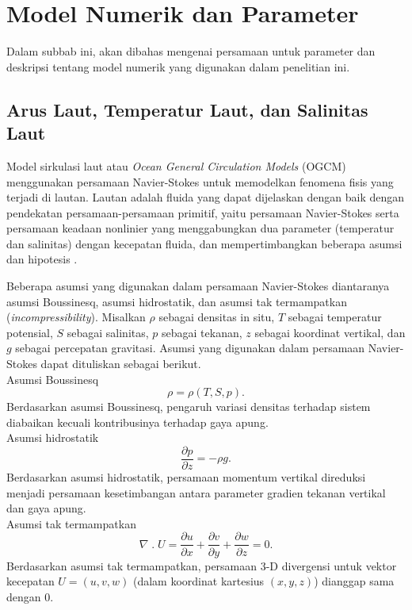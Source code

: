 \section[Model Numerik dan Parameter]{Model Numerik dan Parameter}
\begin{spacing}{1.5}
	\par Dalam subbab ini, akan dibahas mengenai persamaan untuk parameter dan deskripsi tentang model numerik yang digunakan dalam penelitian ini.
	\subsection[Arus Laut, Temperatur Laut, dan Salinitas Laut]{Arus Laut, Temperatur Laut, dan Salinitas Laut}
	
	Model sirkulasi laut atau \textit{Ocean General Circulation Models} (OGCM) menggunakan persamaan Navier-Stokes untuk memodelkan fenomena fisis yang terjadi di lautan. Lautan adalah fluida yang dapat dijelaskan dengan baik dengan pendekatan persamaan-persamaan primitif, yaitu persamaan Navier-Stokes serta persamaan keadaan nonlinier yang menggabungkan dua parameter (temperatur dan salinitas) dengan kecepatan fluida, dan mempertimbangkan beberapa asumsi dan hipotesis .
	
	Beberapa asumsi yang digunakan dalam persamaan Navier-Stokes diantaranya asumsi Boussinesq, asumsi hidrostatik, dan asumsi tak termampatkan (\textit{incompressibility}). Misalkan $\rho$ sebagai densitas in situ, $T$ sebagai temperatur potensial, $S$ sebagai salinitas, $p$ sebagai tekanan, $z$ sebagai koordinat vertikal, dan $g$ sebagai percepatan gravitasi. Asumsi yang digunakan dalam persamaan Navier-Stokes dapat dituliskan sebagai berikut.\\
	Asumsi Boussinesq
	\begin{equation}\label{eq:P1}
		\rho = \rho(T,S,p).
	\end{equation}
	Berdasarkan asumsi Boussinesq, pengaruh variasi densitas terhadap sistem diabaikan kecuali kontribusinya terhadap gaya apung.\\
	Asumsi hidrostatik
	\begin{equation}
		\frac{\partial p}{\partial z} = -\rho g.
	\end{equation}
	Berdasarkan asumsi hidrostatik, persamaan momentum vertikal direduksi menjadi persamaan kesetimbangan antara parameter gradien tekanan vertikal dan gaya apung.\\
	Asumsi tak termampatkan
	\begin{equation}
		\nabla \;.\; U =\frac{\partial u}{\partial x} + \frac{\partial v}{\partial y} + \frac{\partial w}{\partial z} = 0.
	\end{equation}	
	Berdasarkan asumsi tak termampatkan, persamaan 3-D divergensi untuk vektor kecepatan $U = (u,v,w)$ (dalam koordinat kartesius $(x,y,z)$) dianggap sama dengan 0.
	

\end{spacing}
